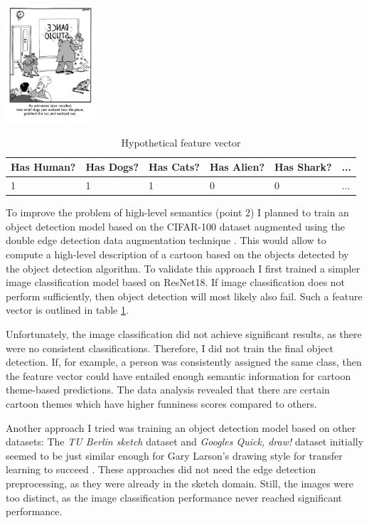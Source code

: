 \documentclass[draft,final,oneside]{vutinfth} %
\begin{document}
\begin{table}[]
\centering
\includegraphics[width=0.25\textwidth]{graphics/example_cartoon.png}
\begin{tabular}{|l|l|l|l|l|l|}
\hline
Has Human? & Has Dogs? & Has Cats? & Has Alien? & Has Shark? & ... \\ \hline
1   & 1 & 1 & 0 & 0 & ... \\
\hline
\end{tabular}
\caption{Hypothetical feature vector}
\label{objectdetectionfeaturevector}
\end{table}

To improve the problem of high-level semantics (point 2) I planned to train an object detection model based on the CIFAR-100 dataset augmented using the double edge detection data augmentation technique \cite{cifar100}. This would allow to compute a high-level description of a cartoon based on the objects detected by the object detection algorithm. To validate this approach I first trained a simpler image classification model based on ResNet18. If image classification does not perform sufficiently, then object detection will most likely also fail. Such a feature vector is outlined in table \ref{objectdetectionfeaturevector}.

Unfortunately, the image classification did not achieve significant results, as there were no consistent classifications. Therefore, I did not train the final object detection. If, for example, a person was consistently assigned the same class, then the feature vector could have entailed enough semantic information for cartoon theme-based predictions. The data analysis revealed that there are certain cartoon themes which have higher funniness scores compared to others. 

Another approach I tried was training an object detection model based on other datasets: The \textit{TU Berlin sketch} dataset and \textit{Googles Quick, draw!} dataset initially seemed to be just similar enough for Gary Larson's drawing style for transfer learning to succeed \cite{tuberlin}\cite{quickdraw}. These approaches did not need the edge detection preprocessing, as they were already in the sketch domain. Still, the images were too distinct, as the image classification performance never reached significant performance.
\end{document}
